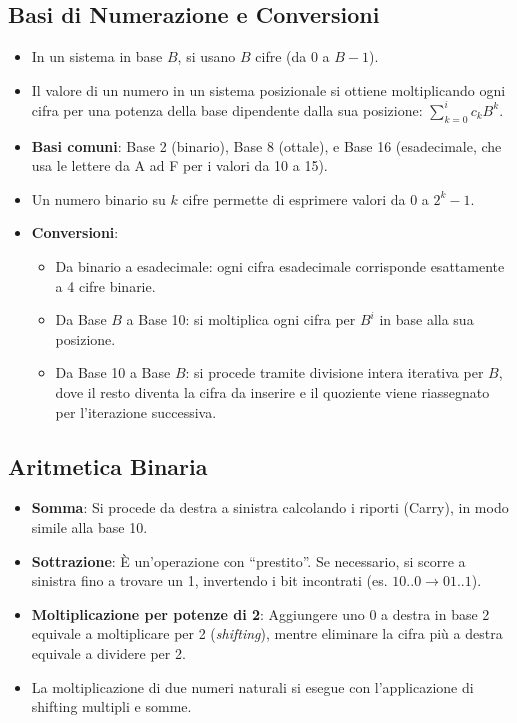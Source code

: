 \documentclass[12pt, a4paper]{article}
\begin{document}
\subsection{Basi di Numerazione e Conversioni}

\begin{itemize}
    \item In un sistema in base $B$, si usano $B$ cifre (da $0$ a $B-1$). 
    \item Il valore di un numero in un sistema posizionale si ottiene moltiplicando ogni cifra per una potenza della base dipendente dalla sua posizione: $\sum_{k=0}^{i}c_{k}B^{k}$. 
    \item \textbf{Basi comuni}: Base 2 (binario), Base 8 (ottale), e Base 16 (esadecimale, che usa le lettere da A ad F per i valori da 10 a 15). 
    \item Un numero binario su $k$ cifre permette di esprimere valori da $0$ a $2^k - 1$. 
    \item \textbf{Conversioni}:
    \begin{itemize}
        \item Da binario a esadecimale: ogni cifra esadecimale corrisponde esattamente a 4 cifre binarie. 
        \item Da Base $B$ a Base 10: si moltiplica ogni cifra per $B^i$ in base alla sua posizione. 
        \item Da Base 10 a Base $B$: si procede tramite divisione intera iterativa per $B$, dove il resto diventa la cifra da inserire e il quoziente viene riassegnato per l'iterazione successiva. 
    \end{itemize}
\end{itemize}

\subsection{Aritmetica Binaria}

\begin{itemize}
    \item \textbf{Somma}: Si procede da destra a sinistra calcolando i riporti (Carry), in modo simile alla base 10. 
    \item \textbf{Sottrazione}: È un'operazione con ``prestito''. Se necessario, si scorre a sinistra fino a trovare un 1, invertendo i bit incontrati (es. $10..0 \rightarrow 01..1$). 
    \item \textbf{Moltiplicazione per potenze di 2}: Aggiungere uno 0 a destra in base 2 equivale a moltiplicare per 2 (\textit{shifting}), mentre eliminare la cifra più a destra equivale a dividere per 2. 
    \item La moltiplicazione di due numeri naturali si esegue con l'applicazione di shifting multipli e somme. 
\end{itemize}
\end{document}
